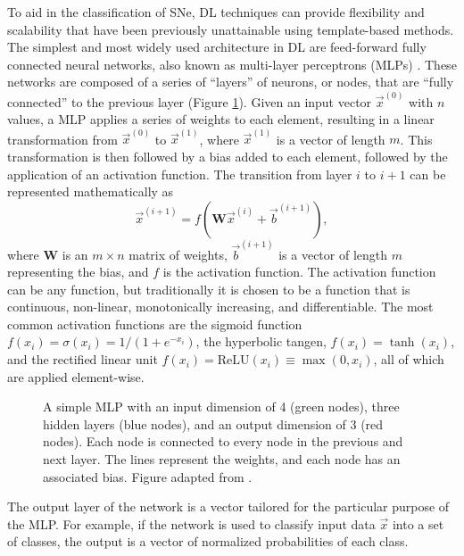 To aid in the classification of SNe, DL techniques can provide 
flexibility and scalability that have been previously unattainable using template-based 
methods. The simplest and most widely used architecture in DL are feed-forward 
fully connected neural networks, also known as multi-layer perceptrons (MLPs) \parencite{popescu2009}.
These networks are composed of a series of ``layers'' of neurons, or nodes, that 
are ``fully connected'' to the previous layer (Figure \ref{fig:MLP}).
Given an input vector $\vec{x}^{(0)}$ with $n$ values, a MLP applies a series of weights to each 
element, resulting in a linear transformation from $\vec{x}^{(0)}$ to $\vec{x}^{(1)}$, where
$\vec{x}^{(1)}$ is a vector of length $m$. This transformation is then followed by a bias added 
to each element, followed by the application of an activation function.
The transition from layer $i$ to $i+1$ can be represented mathematically as 
\begin{equation}\label{eqn:MLP}
    \vec{x}^{(i+1)} = f(\mathbf{W}\vec{x}^{(i)} + \vec{b}^{(i+1)}),
\end{equation}
where $\mathbf{W}$ is an $m \times n$ matrix of weights, $\vec{b}^{(i+1)}$ is a vector of length $m$
representing the bias, and $f$ is the activation function. The activation function can 
be any function, but traditionally it is chosen to be a function that is continuous, non-linear, 
monotonically increasing, and differentiable. The most common activation functions 
are the sigmoid function $f(x_i) = \sigma(x_i) = 1/(1 + e^{-x_i})$, the hyperbolic tangen, 
$f(x_i) = \tanh(x_i)$, and the rectified linear unit
$f(x_i) = \mathrm{ReLU}(x_i) \equiv \max(0,x_i)$, all of which are applied element-wise.
\begin{figure}[t]
    \centering
    
    \caption[Diagram of a Multi-Layered Perceptron]{A simple MLP with an input dimension of 4 (green nodes), three hidden layers (blue nodes), and an output dimension of 3 (red nodes). Each node is connected to every 
    node in the previous and next layer. The lines represent the weights, and each 
    node has an associated bias. Figure adapted from \textcite{neutelings2021_nn}.}
    \label{fig:MLP}
\end{figure}
The output layer of the network is a vector tailored for the particular purpose
of the MLP. For example, if the network is used to classify input data $\vec{x}$ into a set of classes, the output is a vector of normalized probabilities of each class. 

